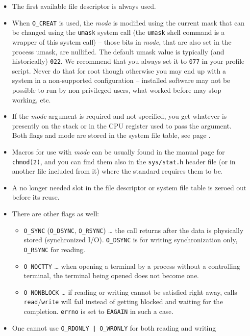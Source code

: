 \begin{itemize}
\item The first available file descriptor is always used.
\item When \texttt{O\_CREAT} is used, the \emph{mode} is modified using the
current mask that can be changed using the \texttt{umask} system call
(the \texttt{umask} shell command is a wrapper of this system call)
-- those bits in \emph{mode}, that are also set in the process umask,
are nullified.
The default umask value is typically (and historically) \texttt{022}.
We recommend that you always set it to \texttt{077} in your profile script.
Never do that for root though otherwise you may end up with a system in
a non-supported configuration -- installed software may not be possible to run
by non-privileged users, what worked before may stop working, etc.
\item If the \emph{mode} argument is required and not specified, you get
whatever is presently on the stack or in the CPU register used to pass the
argument.  Both flags and mode are stored in the system file table, see page
\pageref{OPENFILETABLES}.
\item Macros for use with \emph{mode} can be usually found in the manual page
for \texttt{chmod(2)}, and you can find them also in the \texttt{sys/stat.h}
header file (or in another file included from it) where the standard requires
them to be.
\item A no longer needed slot in the file descriptor or system file table is
zeroed out before its reuse.
\item There are other flags as well:
\begin{itemize}
\item \texttt{O\_SYNC} (\texttt{O\_DSYNC}, \texttt{O\_RSYNC}) \dots{} the call
returns after the data is physically stored (synchronized I/O).
\texttt{O\_DSYNC} is for writing synchronization only, \texttt{O\_RSYNC} for
reading.
\item \texttt{O\_NOCTTY} \dots{} when opening a terminal by a process without a
controlling terminal, the terminal being opened does not become one.
\item {} \texttt{O\_NONBLOCK} \dots{} if reading or writing
cannot be satisfied right away, calls \texttt{read}/\texttt{write} will fail
instead of getting blocked and waiting for the completion.  \texttt{errno} is
set to \texttt{EAGAIN} in such a case.
\end{itemize}
\item One cannot use \texttt{O\_RDONLY | O\_WRONLY} for both reading and writing

\end{itemize}
